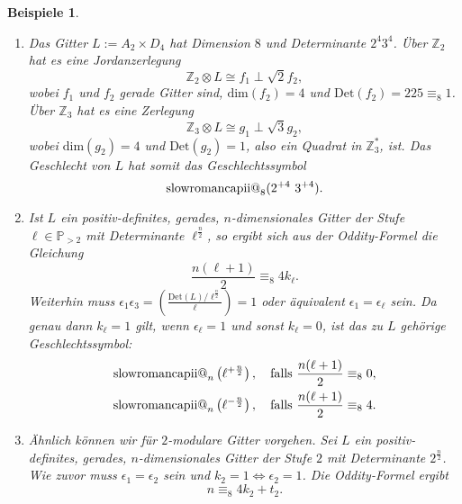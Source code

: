 \documentclass[12pt,a4paper,halfparskip,headsepline,bibtotocnumbered]{scrreprt}
\makeatletter
\theoremstyle{nummermitklammern}
\newtheorem{beispiele}[defsatzusw]{Beispiele}
\theoremstyle{nonumberbreak}
\newcommand{\Z}{\mathbb{Z}}
\renewcommand{\P}{\mathbb{P}}
\newcommand{\Det}{\text{Det}}
\newcommand{\ii}{\text{\expandafter\@slowromancap\romannumeral 2@}}
\makeatother
\begin{document}
\begin{beispiele}
	\begin{enumerate}[label=(\roman*)]
		\item Das Gitter $L := A_2 \times D_4$ hat Dimension $8$ und Determinante $2^4 3^4$. Über $\Z_2$ hat es eine Jordanzerlegung
			\begin{equation*}
				\Z_2 \otimes L \cong f_1 \perp \sqrt{2} f_2,
			\end{equation*}
			wobei $f_1$ und $f_2$ gerade Gitter sind, $\text{dim}(f_2) = 4$ und $\Det(f_2) = 225 \equiv_8 1$. Über $\Z_3$ hat es eine Zerlegung
			\begin{equation*}
				\Z_3 \otimes L \cong g_1 \perp \sqrt{3} g_2,
			\end{equation*}
			wobei $\text{dim}(g_2) = 4$ und $\Det(g_2) = 1$, also ein Quadrat in $\Z_3^\ast$, ist. Das Geschlecht von $L$ hat somit das Geschlechtssymbol
			\begin{equation*}
				\ii_8(2^{+4}\ 3^{+4}).
			\end{equation*}
		\item Ist $L$ ein positiv-definites, gerades, $n$-dimensionales Gitter der Stufe $\ell \in \P_{> 2}$ mit Determinante $\ell^\frac{n}{2}$, so ergibt sich aus der Oddity-Formel die Gleichung
			\begin{equation*}
				\frac{n(\ell+1)}{2} \equiv_8 4 k_\ell.
			\end{equation*}
			Weiterhin muss $\epsilon_1 \epsilon_3 = \left( \frac{\Det(L) / \ell^\frac{n}{2}}{\ell}\right) = 1$ oder äquivalent $\epsilon_1 = \epsilon_\ell$ sein. Da genau dann $k_\ell = 1$ gilt, wenn $\epsilon_\ell = 1$ und sonst $k_\ell = 0$, ist das zu $L$ gehörige Geschlechtssymbol:
			\begin{align*}
				\ii_n\left(\ell^{+\frac{n}{2}}\right), \quad \text{falls } \frac{n(\ell+1)}{2} \equiv_8 0,\\
				\ii_n\left(\ell^{-\frac{n}{2}}\right), \quad \text{falls } \frac{n(\ell+1)}{2} \equiv_8 4.\\
			\end{align*}
		\item Ähnlich können wir für $2$-modulare Gitter vorgehen. Sei $L$ ein positiv-definites, gerades, $n$-dimensionales Gitter der Stufe $2$ mit Determinante $2^\frac{n}{2}$. Wie zuvor muss $\epsilon_1 = \epsilon_2$ sein und $k_2 = 1 \Leftrightarrow \epsilon_2 = 1$. Die Oddity-Formel ergibt
			\begin{equation*}
				n \equiv_8 4 k_2 + t_2.
			\end{equation*}

\end{enumerate}
\end{beispiele}
\end{document}
